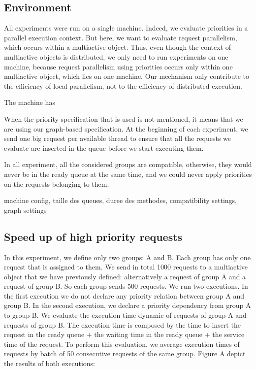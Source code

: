 \documentclass[11pt]{report}
\begin{document}
\subsection{Environment}
All experiments were run on a single machine. Indeed, we evaluate priorities in a parallel execution context. But here, we want to evaluate request parallelism, which occurs within a multiactive object. Thus, even though the context of multiactive objects is distributed, we only need to run experiments on one machine, because request parallelism using priorities occurs only within one multiactive object, which lies on one machine. Our mechanism only contribute to the efficiency of local parallelism, not to the efficiency of distributed execution.

The machine has 

When the priority specification that is used is not mentioned, it means that we are using our graph-based specification.
At the beginning of each experiment, we send one big request per available thread to ensure that all the requests we evaluate are inserted in the queue before we start executing them.

In all experiment, all the considered groups are compatible, otherwise, they would never be in the ready queue at the same time, and we could never apply priorities on the requests belonging to them.

machine config,
taille des queues,
duree des methodes,
compatibility settings,
graph settings

\subsection{Speed up of high priority requests}
In this experiment, we define only two groups: A and B. Each group has only one request that is assigned to them. We send in total 1000 requests to a multiactive object that we have previously defined: alternatively a request of group A and a request of group B. So each group sends 500 requests. We run two executions. In the first execution we do not declare any priority relation between group A and group B. In the second execution, we declare a priority dependency from group A to group B. We evaluate the execution time dynamic of requests of group A and requests of group B. The execution time is composed by the time to insert the request in the ready queue + the waiting time in the ready queue + the service time of the request. To perform this evaluation, we average execution times of requests by batch of 50 consecutive requests of the same group. Figure A depict the results of both executions:
\end{document}
